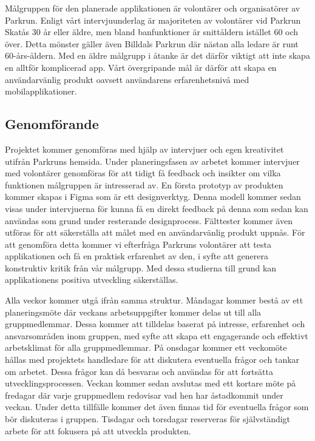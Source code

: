 Målgruppen för den planerade applikationen är volontärer och organisatörer av Parkrun. Enligt vårt intervjuunderlag är majoriteten av volontärer vid Parkrun Skatås 30 år eller äldre, men bland banfunktioner är snittåldern istället 60 och över. Detta mönster gäller även Billdals Parkrun där nästan alla ledare är runt 60-års-åldern. Med en äldre målgrupp i åtanke är det därför viktigt att inte skapa en alltför komplicerad app. Vårt övergripande mål är därför att skapa en användarvänlig produkt oavsett användarens erfarenhetsnivå med mobilapplikationer.

\subsection{Genomförande}

Projektet kommer genomföras med hjälp av intervjuer och egen kreativitet utifrån Parkruns hemsida. Under planeringsfasen av arbetet kommer intervjuer med volontärer genomföras för att tidigt få feedback och insikter om vilka funktionen målgruppen är intresserad av. En första prototyp av produkten kommer skapas i Figma som är ett designverktyg. Denna modell kommer sedan visas under intervjuerna för kunna få en direkt feedback på denna som sedan kan användas som grund under resterande designprocess. Fälttester kommer även utföras för att säkerställa att målet med en användarvänlig produkt uppnås. För att genomföra detta kommer vi efterfråga Parkruns volontärer att testa applikationen och få en praktisk erfarenhet av den, i syfte att generera konstruktiv kritik från vår målgrupp. Med dessa studierna till grund kan applikationens positiva utveckling säkerställas.

Alla veckor kommer utgå ifrån samma struktur. Måndagar kommer bestå av  ett planeringsmöte där veckans arbetsuppgifter kommer delas ut till alla gruppmedlemmar. Dessa kommer att tilldelas baserat på intresse, erfarenhet och ansvarsområden inom gruppen, med syfte att skapa ett engagerande och effektivt arbetsklimat för alla gruppmedlemmar. På onsdagar kommer ett veckomöte hållas med projektets handledare för att diskutera eventuella frågor och tankar om arbetet. Dessa frågor kan då besvaras och användas för att fortsätta utvecklingsprocessen. Veckan kommer sedan avslutas med ett kortare möte på fredagar där varje gruppmedlem redovisar vad hen har åstadkommit under veckan. Under detta tillfälle kommer det även finnas tid för eventuella frågor som bör diskuteras i gruppen. Tisdagar och torsdagar reserveras för självständigt arbete för att fokusera på att utveckla produkten.

